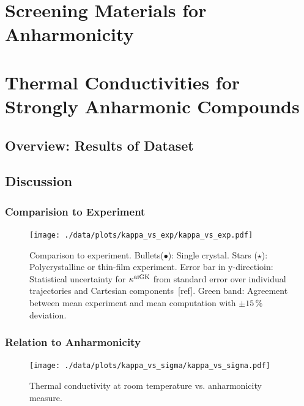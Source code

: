 \documentclass[nobib,a4paper,twoside,notoc,justified,marginals=justified]{tufte-book}
\begin{document}

\chapter{Screening Materials for Anharmonicity}


\chapter{Thermal Conductivities for Strongly Anharmonic Compounds}
\section{Overview: Results of Dataset}
\section{Discussion}
\subsection{Comparision to Experiment}

\begin{figure}
	\texttt{[image: ./data/plots/kappa\_vs\_exp/kappa\_vs\_exp.pdf]}
	\caption{Comparison to experiment. Bullets($\bullet$): Single crystal. Stars ($\star$): Polycrystalline or thin-film experiment. Error bar in y-directioin: Statistical uncertainty for $\kappa^{\rm aiGK}$ from standard error over individual trajectories and Cartesian components~[ref]. Green band: Agreement between mean experiment and mean computation with $\pm 15\,\%$ deviation.}
	\label{fig:kappa_exp}
\end{figure}

\subsection{Relation to Anharmonicity}

\begin{figure}
	\texttt{[image: ./data/plots/kappa\_vs\_sigma/kappa\_vs\_sigma.pdf]}
	\caption{Thermal conductivity at room temperature vs. anharmonicity measure.}
	\label{fig:kappa_sigma}
\end{figure}
\end{document}
